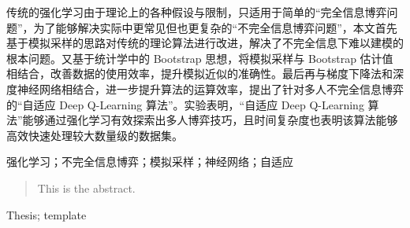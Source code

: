 

\begin{zhaiyao}

传统的强化学习由于理论上的各种假设与限制，只适用于简单的“完全信息博弈问题”，为了能够解决实际中更常见但也更复杂的“不完全信息博弈问题”，本文首先基于模拟采样的思路对传统的理论算法进行改进，解决了不完全信息下难以建模的根本问题。又基于统计学中的 Bootstrap 思想，将模拟采样与 Bootstrap 估计值相结合，改善数据的使用效率，提升模拟近似的准确性。最后再与梯度下降法和深度神经网络相结合，进一步提升算法的运算效率，提出了针对多人不完全信息博弈的“自适应 Deep Q-Learning 算法”。实验表明，“自适应 Deep Q-Learning 算法”能够通过强化学习有效探索出多人博弈技巧，且时间复杂度也表明该算法能够高效快速处理较大数量级的数据集。

\end{zhaiyao}


\begin{guanjianci}
强化学习；不完全信息博弈；模拟采样；神经网络；自适应
\end{guanjianci}



\begin{abstract}


This is the abstract.

\end{abstract}



\begin{keywords}
Thesis; template
\end{keywords}
